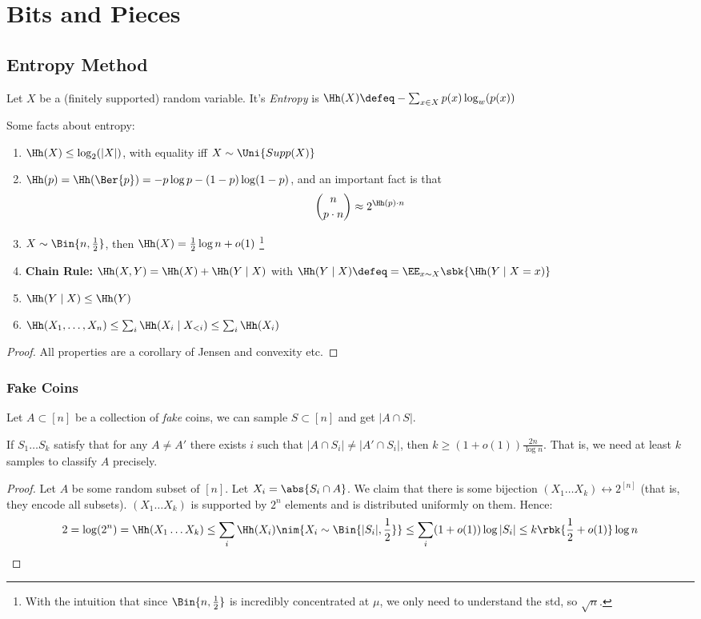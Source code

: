 \documentclass[a4paper, 11pt, oneside]{book}
\begin{document}
\chapter{Bits and Pieces}
\section{Entropy Method}
\begin{yellowBox}
\begin{defn}[Entropy]
Let $X$ be a (finitely supported) random variable. It's \emph{Entropy} is $\Hh(X)\defeq -\sum_{x\in X}p(x)\log_w(p(x))$	
\end{defn}	
\end{yellowBox}
Some facts about entropy:
\begin{thm}
\begin{enumerate}
	\item $\Hh(X)\le \log_2(|X|)$, with equality iff $X\sim\Uni{Supp(X)}$
	\item $\Hh(p) = \Hh(\Ber{p}) = -p\log p - (1-p)\log (1-p)$, and an important fact is that $${n\choose p\cdot n} \approx 2^{\Hh(p)\cdot n}$$
	\item $X\sim \Bin{n,\frac{1}{2}}$, then $\Hh(X) = \frac{1}{2}\log n + o(1)$ \footnote{With the intuition that since $\Bin{n,\frac{1}{2}}$ is incredibly concentrated at $\mu$, we only need to understand the std, so $\sqrt{n}$.}
	\item \textbf{Chain Rule:} $\Hh(X,Y) = \Hh(X) + \Hh(Y\mid X)$ with $\Hh(Y\mid X) \defeq = \EE_{x\sim X}\sbk{\Hh(Y\mid X = x)}$
	\item $\Hh(Y\mid X)\le \Hh (Y)$
	\item $\Hh(X_1,\ldots ,X_n)\le \sum_{i} \Hh(X_i\mid X_{<i}) \le \sum_{i} \Hh(X_i)$
\end{enumerate}
\end{thm}
\begin{proof}
	All properties are a corollary of Jensen and convexity etc.
\end{proof}

\subsection{Fake Coins}
Let $A\subset [n]$ be a collection of \emph{fake} coins, we can sample $S\subset [n]$ and get $|A\cap S|$. 
\begin{claim}
	If $S_1\ldots S_k$ satisfy that for any $A\ne A'$ there exists $i$ such that $|A\cap S_i|\ne |A' \cap S_i|$, then $k \ge (1+o(1))\frac{2n}{\log n}$. That is, we need at least $k$ samples to classify $A$ precisely.
\end{claim}
\begin{proof}
	Let $A$ be some random subset of $[n]$. Let $X_i = \abs{S_i\cap A}$. We claim that there is some bijection $(X_1\ldots X_k)\leftrightarrow 2^{[n]}$ (that is, they encode all subsets). $(X_1\ldots X_k)$ is supported by $2^n$ elements and is distributed uniformly on them. Hence:
	\[
	2 = \log(2^n) = \Hh(X_1\ldots X_k) \le \sum_{i}\Hh(X_i)\nim{X_i\sim \Bin{|S_i|,\frac{1}{2}}}\le \sum_i (1+o(1))\log|S_i|\le k\rbk{\frac{1}{2} + o(1)}\log n
	\]
\end{proof}
\end{document}
